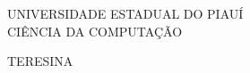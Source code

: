 \documentclass[
	12pt,				%
	openright,			%
	oneside,			%
	a4paper,			%
	chapter=TITLE,		%
	english,			%
	brazil,				%
	]{abntex2}
\begin{document}
\frenchspacing 


    \begin{center}
    {\ABNTEXchapterfont\large UNIVERSIDADE ESTADUAL DO PIAUÍ}\\
    {\ABNTEXchapterfont\large CIÊNCIA DA COMPUTAÇÃO}
    
    \vspace*{\fill}\vspace*{\fill}
    {\ABNTEXchapterfont\large \imprimirautor}  
    \vspace*{\fill}
   
    \vspace*{\fill}\vspace*{\fill}
    \begin{center}
    \ABNTEXchapterfont \bfseries \Large \imprimirtitulo
    \end{center}
    \vspace*{\fill}\vspace*{\fill}
   
  
   \end{center}  

      
    \begin{center}
    \vspace*{0.5cm}
    {\ABNTEXchapterfont\large TERESINA}
    \par
    {\ABNTEXchapterfont\large \imprimirdata}
    \vspace*{1cm}
    \end{center}
\end{document}
